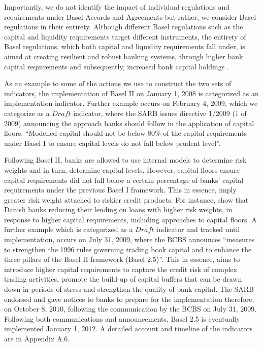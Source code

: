 \documentclass[
  letterpaper,
  DIV=11,
  numbers=noendperiod]{scrartcl}
\begin{document}
Importantly, we do not identify the impact of individual regulations and
requirements under Basel Accords and Agreements but rather, we consider
Basel regulations in their entirety. Although different Basel
regulations such as the capital and liquidity requirements target
different instruments, the entirety of Basel regulations, which both
capital and liquidity requirements fall under, is aimed at creating
resilient and robust banking systems, through higher bank capital
requirements and subsequently, increased bank capital holdings
\citep{cohen2016banks} \citep{cerutti2018changes}.

As an example to some of the actions we use to construct the two sets of
indicators, the implementation of Basel II on January 1, 2008 is
categorized as an implementation indicator. Further example occurs on
February 4, 2009, which we categorize as a \(Draft\) indicator, where
the SARB issues directive 1/2009 (1 of 2009) announcing the approach
banks should follow in the application of capital floors. ``Modelled
capital should not be below 80\% of the capital requirements under Basel
I to ensure capital levels do not fall below prudent level''.

Following Basel II, banks are allowed to use internal models to
determine risk weights and in turn, determine capital levels. However,
capital floors ensure capital requirements did not fall below a certain
percentage of banks' capital requirements under the previous Basel I
framework\citep{basel06}. This in essence, imply greater risk weight
attached to riskier credit products. For instance,
\cite{imbierowicz2018time} show that Danish banks reducing their lending
on loans with higher risk weights, in response to higher capital
requirements, including approaches to capital floors. A further example
which is categorized as a \(Draft\) indicator and tracked until
implementation, occurs on July 31, 2009, where the BCBS announces
``measures to strengthen the 1996 rules governing trading book capital
and to enhance the three pillars of the Basel II framework (Basel
2.5)''. This in essence, aims to introduce higher capital requirements
to capture the credit risk of complex trading activities, promote the
build-up of capital buffers that can be drawn down in periods of stress
and strengthen the quality of bank capital\citep{basel09}. The SARB
endorsed and gave notices to banks to prepare for the implementation
therefore, on October 8, 2010, following the communication by the BCBS
on July 31, 2009. Following both communications and announcements, Basel
2.5 is eventually implemented January 1, 2012. A detailed account and
timeline of the indicators are in Appendix A.6.
\end{document}

